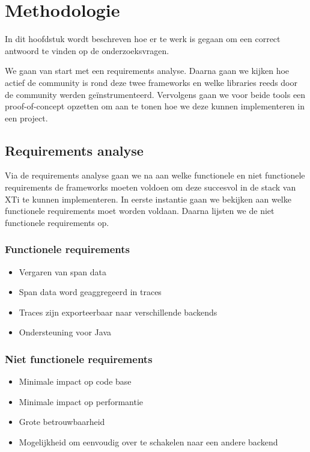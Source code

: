 
\chapter{Methodologie}
\label{ch:methodologie}


In dit hoofdstuk wordt beschreven hoe er te werk is gegaan om een correct antwoord te vinden op de onderzoeksvragen.

We gaan van start met een requirements analyse. Daarna gaan we kijken hoe actief de community is rond deze twee frameworks en welke libraries reeds door de community werden geïnstrumenteerd. Vervolgens gaan we voor beide tools een proof-of-concept opzetten om aan te tonen hoe we deze kunnen implementeren in een project.

\section{Requirements analyse}
Via de requirements analyse gaan we na aan welke functionele en niet functionele requirements de frameworks moeten voldoen om deze succesvol in de stack van XTi te kunnen implementeren. In eerste instantie gaan we bekijken aan welke functionele requirements moet worden voldaan. Daarna lijsten we de niet functionele requirements op.

\subsection{Functionele requirements}
\begin{itemize}
	\item Vergaren van span data
	\item Span data word geaggregeerd in traces
	\item Traces zijn exporteerbaar naar verschillende backends
	\item Ondersteuning voor Java
\end{itemize}

\subsection{Niet functionele requirements}
\begin{itemize}
	\item Minimale impact op code base
	\item Minimale impact op performantie
	\item Grote betrouwbaarheid
	\item Mogelijkheid om eenvoudig over te schakelen naar een andere backend
\end{itemize}

